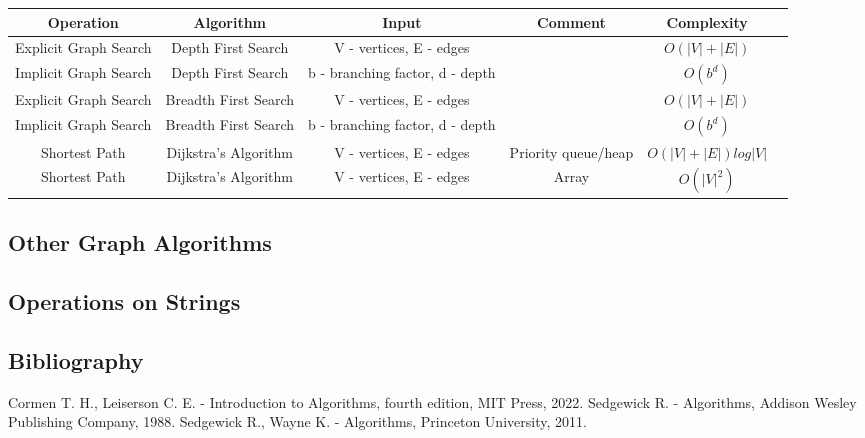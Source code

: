 \documentclass{article}
\begin{document}
\begin{table}[ht]
	\centering
	\scriptsize
	\begin{tabular}{c ccccc}
		Operation & Algorithm & Input & Comment & Complexity \\
		\hline
		Explicit Graph Search & Depth First Search & V - vertices, E - edges &  & $O(|V| + |E|)$ \\
		Implicit Graph Search & Depth First Search & b - branching factor, d - depth & & $O(b^d)$ \\
		Explicit Graph Search & Breadth First Search & V - vertices, E - edges & & $O(|V| + |E|)$ \\
		Implicit Graph Search & Breadth First Search & b - branching factor, d - depth & & $O(b^d)$ \\
		Shortest Path & Dijkstra's Algorithm & V - vertices, E - edges & Priority queue/heap & $O(|V| + |E|)log|V|$ \\
		Shortest Path & Dijkstra's Algorithm & V - vertices, E - edges & Array & $O(|V|^2)$ \\
		\hline
	\end{tabular}
\end{table}


\newpage
\subsection*{Other Graph Algorithms}



\newpage
\subsection*{Operations on Strings}



\newpage
\subsection*{Bibliography}

\begin{thebibliography}{20}
	Cormen T. H., Leiserson C. E. - Introduction to Algorithms, fourth edition, MIT Press, 2022.
	Sedgewick R. - Algorithms, Addison Wesley Publishing Company, 1988.
	Sedgewick R., Wayne K. - Algorithms, Princeton University, 2011.
\end{thebibliography}

\end{document}
